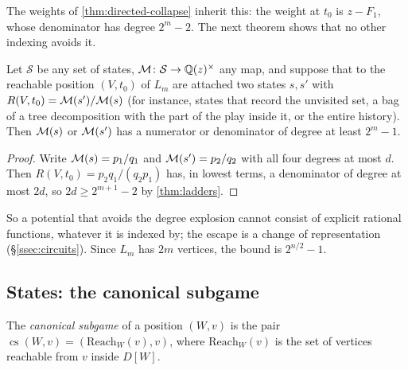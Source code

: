 The weights of \cref{thm:directed-collapse} inherit this: the weight at $t_0$ is $z-F_1$, whose denominator has degree $2^{m}-2$. The next theorem shows that no other indexing avoids it.

\begin{theorem}\label{thm:intrinsic-degree}
Let $\mathcal S$ be any set of states, $\mathcal{M}\colon\mathcal S\to\mathbb{Q}(z)^{\times}$ any map, and suppose that to the reachable position $(V,t_0)$ of $L_m$ are attached two states $s,s'$ with $R(V,t_0)=\mathcal{M}(s')/\mathcal{M}(s)$ \textup{(}for instance, states that record the unvisited set, a bag of a tree decomposition with the part of the play inside it, or the entire history\textup{)}. Then $\mathcal{M}(s)$ or $\mathcal{M}(s')$ has a numerator or denominator of degree at least $2^{m}-1$.
\end{theorem}
\begin{proof}
Write $\mathcal{M}(s)=p_1/q_1$ and $\mathcal{M}(s')=p_2/q_2$ with all four degrees at most $d$. Then $R(V,t_0)=p_2q_1/(q_2p_1)$ has, in lowest terms, a denominator of degree at most $2d$, so $2d\ge2^{m+1}-2$ by \cref{thm:ladders}.
\end{proof}

So a potential that avoids the degree explosion cannot consist of explicit rational functions, whatever it is indexed by; the escape is a change of representation (\S\ref{ssec:circuits}). Since $L_m$ has $2m$ vertices, the bound is $2^{n/2}-1$.

\subsection{States: the canonical subgame}\label{ssec:canonical}

\begin{definition}\label{def:canonical}
The \emph{canonical subgame} of a position $(W,v)$ is the pair $\operatorname{cs}(W,v)=(\mathrm{Reach}_W(v),v)$, where $\mathrm{Reach}_W(v)$ is the set of vertices reachable from $v$ inside $D[W]$.
\end{definition}

